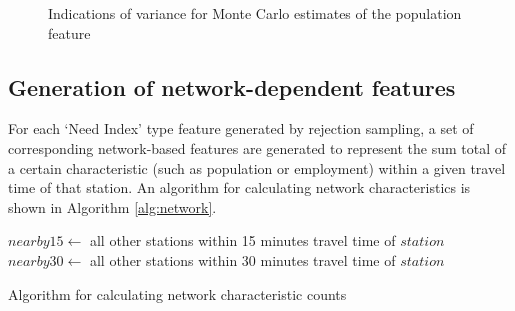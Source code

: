 \documentclass[11pt]{article}
\begin{document}
\begin{figure}[H]
\centering
{}
\caption{Indications of variance for Monte Carlo estimates of the population feature}\label{fig:mcvar}
\end{figure}

  

\subsection{Generation of network-dependent features}\label{sec:net}

For each `Need Index' type feature generated by rejection sampling, a set of corresponding network-based features are generated to represent the sum total of a certain characteristic (such as population or employment) within a given travel time of that station. An algorithm for calculating network characteristics is shown in Algorithm \ref{alg:network}. 

\begin{algorithm}
\begin{algorithmic}
	\State$nearby15 \gets$ all other stations within 15 minutes travel time of $station$
	\State$nearby30 \gets$ all other stations within 30 minutes travel time of $station$
		\EndFor
		\EndFor
	\EndFor
\EndFor
\end{algorithmic}\caption{Algorithm for calculating network characteristic counts}\label{alg:network}
\end{algorithm}
\end{document}

